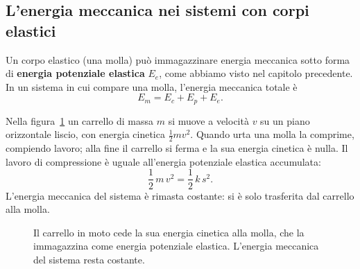 \subsection{L'energia meccanica nei sistemi con corpi elastici}
Un corpo elastico (una molla) può immagazzinare energia meccanica sotto forma di \textbf{energia potenziale elastica} $E_e$, come abbiamo visto nel capitolo precedente. In un sistema in cui compare una molla, l'energia meccanica totale è
\[ E_m = E_c + E_p + E_e. \]

Nella figura~\ref{fig:carrello-molla} un carrello di massa $m$ si muove a velocità $v$ su un piano orizzontale liscio, con energia cinetica $\tfrac12 m v^2$. Quando urta una molla la comprime, compiendo lavoro; alla fine il carrello si ferma e la sua energia cinetica è nulla. Il lavoro di compressione è uguale all'energia potenziale elastica accumulata:
\[ \frac12\,m\,v^2 = \frac12\,k\,s^2. \]
L'energia meccanica del sistema è rimasta costante: si è solo trasferita dal carrello alla molla.

\begin{figure}[!htbp]
    \centering
    \caption{Il carrello in moto cede la sua energia cinetica alla molla, che la immagazzina come energia potenziale elastica. L'energia meccanica del sistema resta costante.}
    \label{fig:carrello-molla}
\end{figure}

